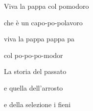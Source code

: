 \documentclass{article}
\begin{document}
Viva la pappa col pomodoro

che \`e un capo-po-polavoro

viva la pappa pappa pa

col po-po-po-modor

La storia del passato

e quella dell'arrosto

e della selezione i fieni
\end{document}
